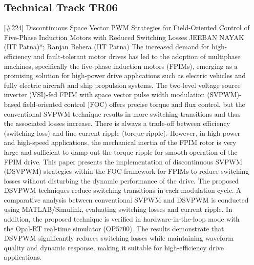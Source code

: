\clearpage \subsection{Technical Track TR06}\nopagebreak {} \begin{abstract_online} {[\#224] Discontinuous Space Vector PWM Strategies for Field-Oriented Control of Five-Phase Induction Motors with Reduced Switching Losses} {} {JEEBAN NAYAK (IIT Patna)*; Ranjan Behera (IIT Patna)} {} The increased demand for high-efficiency and fault-tolerant motor drives has led to the adoption of multiphase machines, specifically the five-phase induction motors (FPIMs), emerging as a promising solution for high-power drive applications such as electric vehicles and fully electric aircraft and ship propulsion systems. The two-level voltage source inverter (VSI)-fed FPIM with space vector pulse width modulation (SVPWM)-based field-oriented control (FOC) offers precise torque and flux control, but the conventional SVPWM technique results in more switching transitions and thus the associated losses increase. There is always a trade-off between efficiency (switching loss) and line current ripple (torque ripple). However, in high-power and high-speed applications, the mechanical inertia of the FPIM rotor is very large and sufficient to damp out the torque ripple for smooth operation of the FPIM drive. This paper presents the implementation of discontinuous SVPWM (DSVPWM) strategies within the FOC framework for FPIMs to reduce switching losses without disturbing the dynamic performance of the drive. The proposed DSVPWM techniques reduce switching transitions in each modulation cycle. A comparative analysis between conventional SVPWM and DSVPWM is conducted using MATLAB/Simulink, evaluating switching losses and current ripple. In addition, the proposed technique is verified in hardware-in-the-loop mode with the Opal-RT real-time simulator (OP5700). The results demonstrate that DSVPWM significantly reduces switching losses while maintaining waveform quality and dynamic response, making it suitable for high-efficiency drive applications. \end{abstract_online} 
